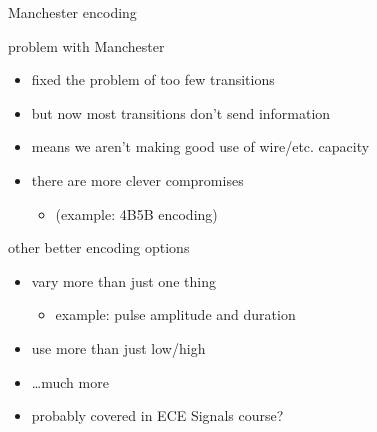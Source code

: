 

\begin{frame}{Manchester encoding}
\end{frame}

\begin{frame}{problem with Manchester}
    \begin{itemize}
    \item fixed the problem of too few transitions
    \vspace{.5cm}
    \item but now most transitions don't send information
    \item means we aren't making good use of wire/etc. capacity
    \vspace{.5cm}
    \item there are more clever compromises
        \begin{itemize}
        \item (example: 4B5B encoding)
        \end{itemize}
    \end{itemize}
\end{frame}

\begin{frame}{other better encoding options}
    \begin{itemize}
    \item vary more than just one thing
        \begin{itemize}
        \item example: pulse amplitude and duration
        \end{itemize}
    \item use more than just low/high
    \item \ldots much more
    \vspace{.5cm}
    \item probably covered in ECE Signals course?
    \end{itemize}
\end{frame}
